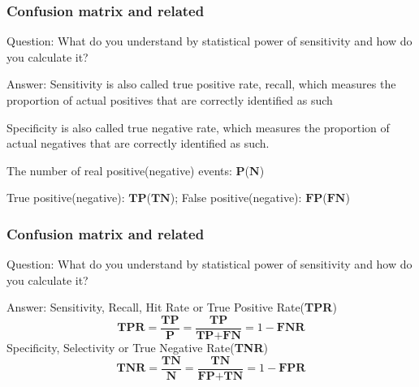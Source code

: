 \documentclass[11pt]{beamer}
\begin{document}
\begin{frame}
\frametitle{Confusion matrix and related}
\begin{block}{Question:}
	What do you understand by statistical power of sensitivity and how do you calculate it?
\end{block}
\begin{block}{Answer:}
	Sensitivity is also called true positive rate, recall, which measures the proportion of actual positives that are correctly identified as such
	
	Specificity is also called true negative rate, which measures the proportion of actual negatives that are correctly identified as such.
	
	The number of real positive(negative) events: $\textbf{P}$($\textbf{N}$)
	
	True positive(negative): $\textbf{TP}$($\textbf{TN}$); False positive(negative): $\textbf{FP}$($\textbf{FN}$)
\end{block}
\end{frame}

\begin{frame}
\frametitle{Confusion matrix and related}
\begin{block}{Question:}
	What do you understand by statistical power of sensitivity and how do you calculate it?
\end{block}
\begin{block}{Answer:}
	Sensitivity, Recall, Hit Rate or True Positive Rate(\textbf{TPR})
	\[
		\textbf{TPR} = \frac{\textbf{TP}}{\textbf{P}} = \frac{\textbf{TP}}{\textbf{TP}+\textbf{FN}}
		=1 - \textbf{FNR}
	\]
	Specificity, Selectivity or True Negative Rate(\textbf{TNR})
	\[
		\textbf{TNR} = \frac{\textbf{TN}}{\textbf{N}} = \frac{\textbf{TN}}{\textbf{FP}+\textbf{TN}}
		=1 - \textbf{FPR}
	\]
\end{block}
\end{frame}
\end{document}
